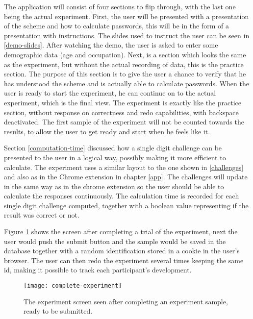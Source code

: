 \par The application will consist of four sections to flip through, with the last one being the actual experiment. First, the user will be presented with a presentation of the scheme and how to calculate passwords, this will be in the form of a presentation with instructions. The slides used to instruct the user can be seen in \autoref{demo-slides}. After watching the demo, the user is asked to enter some demographic data (age and occupation). Next, is a section which looks the same as the experiment, but without the actual recording of data, this is the practice section. The purpose of this section is to give the user a chance to verify that he has understood the scheme and is actually able to calculate passwords. When the user is ready to start the experiment, he can continue on to the actual experiment, which is the final view. The experiment is exactly like the practice section, without response on correctness and redo capabilities, with backspace deactivated. The first sample of the experiment will not be counted towards the results, to allow the user to get ready and start when he feels like it. 


\par Section \ref{computation-time} discussed how a single digit challenge can be presented to the user in a logical way, possibly making it more efficient to calculate. The experiment uses a similar layout to the one shown in \autoref{challenges} and also as in the Chrome extension in chapter \ref{app}. The challenges will update in the same way as in the chrome extension so the user should be able to calculate the responses continuously. The calculation time is recorded for each single digit challenge computed, together with a boolean value representing if the result was correct or not. 
\par Figure \ref{complete-experiment} shows the screen after completing a trial of the experiment, next the user would push the submit button and the sample would be saved in the database together with a random identification stored in a cookie in the user's browser. The user can then redo the experiment several times keeping the same id, making it possible to track each participant's development.

\begin{figure}[h]
    \texttt{[image: complete-experiment]}
    \caption{The experiment screen seen after completing an experiment sample, ready to be submitted.}
    \label{complete-experiment}
\end{figure}

